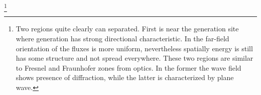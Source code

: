 \documentclass[12pt]{article}
\begin{document}

\footnote{ Two 
	regions quite 
	clearly 
	can separated. First is near the generation site where generation has strong directional 
	characteristic. In the far-field orientation of the fluxes is more uniform, nevertheless 
	spatially 
	energy is still has some structure and not spread everywhere. These two regions are similar to 
	Fresnel and Fraunhofer zones from optics. In the former the wave field shows presence of 
	diffraction, while the latter is characterized by plane wave.}\\
\end{document}
